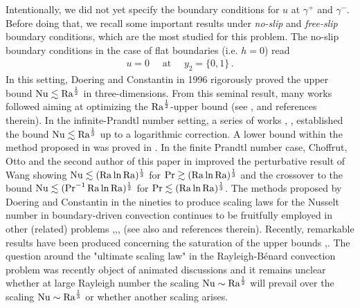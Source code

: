\documentclass{article}
\theoremstyle{definition}
\theoremstyle{definition}
\newcommand{\Pra}{\rm{Pr}}
\newcommand{\Ra}{{\rm{Ra}}}
\newcommand{\Nu}{{\rm{Nu}}}
\begin{document}
Intentionally, we did not yet specify the boundary conditions for $u$ at $\gamma^+$ and $\gamma^-$. Before doing that, we recall some important results under \textit{no-slip} and \textit{free-slip} boundary conditions, which are the most studied for this problem.
The no-slip boundary conditions in the case of flat boundaries (i.e. $h=0$) read
\begin{align*}
    u=0\quad \mbox{ at }\quad y_2=\{0,1\}\,.
\end{align*}
In this setting, Doering and Constantin in 1996 \cite{DC96} rigorously proved the upper bound $\Nu\lesssim \Ra^{\frac 12}$ in three-dimensions. From this seminal result, many works followed aiming at optimizing the $\Ra^{\frac 12}$-upper bound (see \cite{N21}, \cite{FAW21} and references therein). In the infinite-Prandtl number setting, a series of works \cite{CD99}, \cite{DOR06}, \cite{OS11} established the bound $\Nu\lesssim \Ra^{\frac 13}$ up to a logarithmic correction. A lower bound within the method proposed in \cite{CD99} was proved in \cite{NO17}. In the finite Prandtl number case, Choffrut, Otto and the second author of this paper in \cite{choffrutNobiliOttoUpperBoundsOnNusseltNumberAtFinitePrandtlNumber} improved the perturbative result of Wang \cite{WA08_boundOn} showing $\Nu\lesssim (\Ra\ln\Ra)^{\frac 13}$ for $\Pra\gtrsim (\Ra\ln\Ra)^{\frac 13}$ and the crossover to the bound $\Nu\lesssim (\Pr^{-1}\Ra\ln\Ra)^{\frac 12}$ for $\Pra\lesssim(\Ra\ln\Ra)^{\frac 13}$. The methods proposed by Doering and Constantin in the nineties to produce scaling laws for the Nusselt number in boundary-driven convection continues to be fruitfully employed in other (related) problems \cite{tobasco2022},\cite{DC01},\cite{FNW20}, \cite{AFW21} (see also \cite{Goluskin2016} and references therein). Recently, remarkable results have been produced concerning the saturation of the upper bounds \cite{DT19},\cite{kumar2022}.
%
The question around the "ultimate scaling law" in the Rayleigh-B\'enard convection problem was recently object of animated discussions \cite{doering2019} and it remains unclear whether at large Rayleigh number the scaling $\Nu\sim \Ra^{\frac 12}$ will prevail over the scaling $\Nu\sim \Ra^{\frac 13}$ or whether another scaling arises. 
\end{document}
